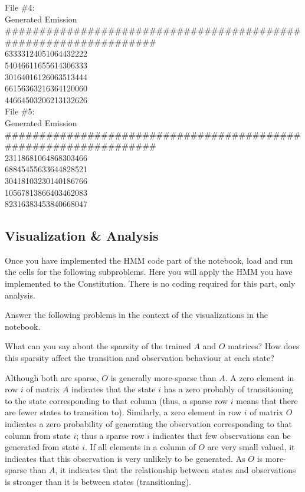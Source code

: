 \begin{solution}
File \#4:\\
Generated Emission   \\         
{\footnotesize \#\#\#\#\#\#\#\#\#\#\#\#\#\#\#\#\#\#\#\#\#\#\#\#\#\#\#\#\#\#\#\#\#\#\#\#\#\#\#\#\#\#\#\#\#\#\#\#\#\#\#\#\#\#\#\#\#\#\#\#\#\#\#\#\#}\\
63333124051064432222          \\
54046611655614306333          \\
30164016126063513444          \\
66156363216364120060          \\
44664503206213132626          \\

File \#5:\\
Generated Emission            \\
{\footnotesize \#\#\#\#\#\#\#\#\#\#\#\#\#\#\#\#\#\#\#\#\#\#\#\#\#\#\#\#\#\#\#\#\#\#\#\#\#\#\#\#\#\#\#\#\#\#\#\#\#\#\#\#\#\#\#\#\#\#\#\#\#\#\#\#\#}\\
23118681064868303466          \\
68845455633644828521          \\
30418103230140186766          \\
10567813866403462083          \\
82316383453840668047          \\
\end{solution}

\subsection{Visualization \& Analysis}

Once you have implemented the HMM code part of the notebook, load and run the cells for the following subproblems. Here you will apply the HMM you have implemented to the Constitution. There is no coding required for this part, only analysis.

Answer the following problems in the context of the visualizations in the notebook.

\indent\problem[3] %
What can you say about the sparsity of the trained $A$ and $O$ matrices? How does this sparsity affect the transition and observation behaviour at each state?
\begin{solution}
  Although both are sparse, $O$ is generally more-sparse than $A$. A zero element in row $i$ of matrix $A$ indicates that the state $i$ has a zero probably of transitioning to the state corresponding to that column (thus, a sparse row $i$ means that there are fewer states to transition to). Similarly, a zero element in row $i$ of matrix $O$ indicates a zero probability of generating the observation corresponding to that column from state $i$; thus a sparse row $i$ indicates that few observations can be generated from state $i$. If all elements in a column of $O$ are very small valued, it indicates that this observation is very unlikely to be generated. As $O$ is more-sparse than $A$, it indicates that the relationship between states and observations is stronger than it is between states (transitioning). 
\end{solution}

